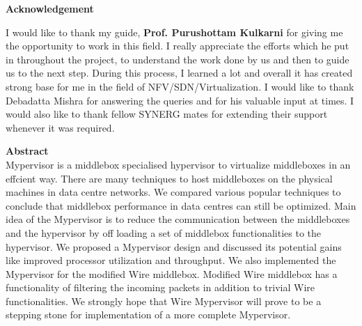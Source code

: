\documentclass[a4paper,11pt]{report}
\begin{document}
\newpage
\vspace*{3cm}
{\center \textbf {Acknowledgement}\\}

\vspace{0.5cm}
\noindent I would like to thank my guide, \textbf {Prof. Purushottam Kulkarni} for giving me the opportunity to work in this field. I really appreciate the efforts which he put in throughout the project, to understand the work done by us and then to guide us to the next step. During this process, I learned a lot and overall it has created strong base for me in the field of NFV/SDN/Virtualization. I would like to thank Debadatta Mishra for answering the queries and for his valuable input at times. I would also like to thank fellow SYNERG mates for extending their support whenever it was required.   
\newpage

\vspace*{2cm}
{\center \textbf {Abstract}\\}
\vspace{1cm}
\noindent Mypervisor is a middlebox specialised hypervisor to virtualize middleboxes in an effcient way. There are many techniques to host middleboxes on the physical machines in data centre networks. We compared various popular techniques to conclude that middlebox performance in data centres can still be optimized. Main idea of the Mypervisor is to reduce the communication between the middleboxes and the hypervisor by off loading a set of middlebox functionalities to the hypervisor. We proposed a Mypervisor design and discussed its potential gains like improved processor utilization and throughput. We also implemented the Mypervisor for the modified Wire middlebox. Modified Wire middlebox has a functionality of filtering the incoming packets in addition to trivial Wire functionalities. We strongly hope that Wire Mypervisor will prove to be a stepping stone for implementation of a more complete Mypervisor.   
\end{document}
